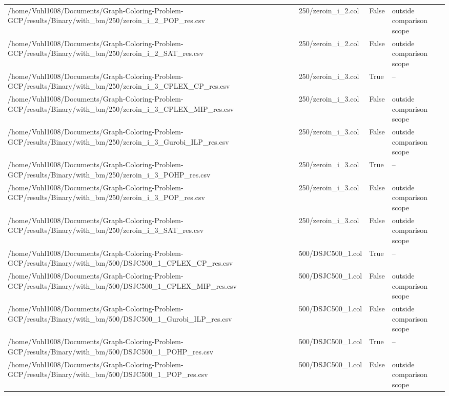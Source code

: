 \begin{table}[htbp]
\begin{tabular}{llll}
/home/Vuhl1008/Documents/Graph-Coloring-Problem-GCP/results/Binary/with\_bm/250/zeroin\_i\_2\_POP\_res.csv & 250/zeroin\_i\_2.col & False & outside comparison scope \\
/home/Vuhl1008/Documents/Graph-Coloring-Problem-GCP/results/Binary/with\_bm/250/zeroin\_i\_2\_SAT\_res.csv & 250/zeroin\_i\_2.col & False & outside comparison scope \\
/home/Vuhl1008/Documents/Graph-Coloring-Problem-GCP/results/Binary/with\_bm/250/zeroin\_i\_3\_CPLEX\_CP\_res.csv & 250/zeroin\_i\_3.col & True & -- \\
/home/Vuhl1008/Documents/Graph-Coloring-Problem-GCP/results/Binary/with\_bm/250/zeroin\_i\_3\_CPLEX\_MIP\_res.csv & 250/zeroin\_i\_3.col & False & outside comparison scope \\
/home/Vuhl1008/Documents/Graph-Coloring-Problem-GCP/results/Binary/with\_bm/250/zeroin\_i\_3\_Gurobi\_ILP\_res.csv & 250/zeroin\_i\_3.col & False & outside comparison scope \\
/home/Vuhl1008/Documents/Graph-Coloring-Problem-GCP/results/Binary/with\_bm/250/zeroin\_i\_3\_POHP\_res.csv & 250/zeroin\_i\_3.col & True & -- \\
/home/Vuhl1008/Documents/Graph-Coloring-Problem-GCP/results/Binary/with\_bm/250/zeroin\_i\_3\_POP\_res.csv & 250/zeroin\_i\_3.col & False & outside comparison scope \\
/home/Vuhl1008/Documents/Graph-Coloring-Problem-GCP/results/Binary/with\_bm/250/zeroin\_i\_3\_SAT\_res.csv & 250/zeroin\_i\_3.col & False & outside comparison scope \\
/home/Vuhl1008/Documents/Graph-Coloring-Problem-GCP/results/Binary/with\_bm/500/DSJC500\_1\_CPLEX\_CP\_res.csv & 500/DSJC500\_1.col & True & -- \\
/home/Vuhl1008/Documents/Graph-Coloring-Problem-GCP/results/Binary/with\_bm/500/DSJC500\_1\_CPLEX\_MIP\_res.csv & 500/DSJC500\_1.col & False & outside comparison scope \\
/home/Vuhl1008/Documents/Graph-Coloring-Problem-GCP/results/Binary/with\_bm/500/DSJC500\_1\_Gurobi\_ILP\_res.csv & 500/DSJC500\_1.col & False & outside comparison scope \\
/home/Vuhl1008/Documents/Graph-Coloring-Problem-GCP/results/Binary/with\_bm/500/DSJC500\_1\_POHP\_res.csv & 500/DSJC500\_1.col & True & -- \\
/home/Vuhl1008/Documents/Graph-Coloring-Problem-GCP/results/Binary/with\_bm/500/DSJC500\_1\_POP\_res.csv & 500/DSJC500\_1.col & False & outside comparison scope \\

\end{tabular}
\end{table}
